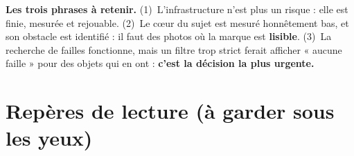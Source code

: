 \documentclass[10pt,a4paper]{article}
\begin{document}
\begin{clair}
\textbf{Les trois phrases à retenir.} (1)~L'infrastructure n'est plus un risque : elle est finie,
mesurée et rejouable. (2)~Le cœur du sujet est mesuré honnêtement bas, et son obstacle est
identifié : il faut des photos où la marque est \textbf{lisible}. (3)~La recherche de failles
fonctionne, mais un filtre trop strict ferait afficher « aucune faille » pour des objets qui en
ont : \textbf{c'est la décision la plus urgente.}
\end{clair}

\section{Repères de lecture (à garder sous les yeux)}
\end{document}
